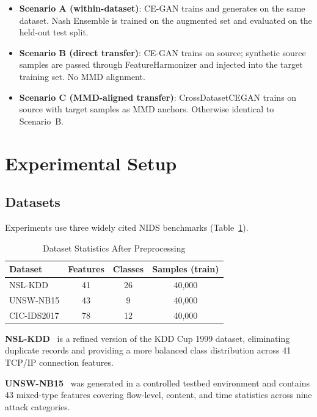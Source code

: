 \documentclass[conference]{IEEEtran}
\begin{document}
\begin{itemize}
  \item \textbf{Scenario A (within-dataset)}: CE-GAN trains and generates
    on the same dataset. Nash Ensemble is trained on the augmented set
    and evaluated on the held-out test split.
  \item \textbf{Scenario B (direct transfer)}: CE-GAN trains on source;
    synthetic source samples are passed through FeatureHarmonizer and
    injected into the target training set. No MMD alignment.
  \item \textbf{Scenario C (MMD-aligned transfer)}: CrossDatasetCEGAN
    trains on source with target samples as MMD anchors. Otherwise
    identical to Scenario~B.
\end{itemize}

\section{Experimental Setup}

\subsection{Datasets}

Experiments use three widely cited NIDS benchmarks (Table~\ref{tab:datasets}).

\begin{table}[htbp]
\caption{Dataset Statistics After Preprocessing}
\label{tab:datasets}
\centering
\begin{tabular}{lccc}
\toprule
Dataset & Features & Classes & Samples (train) \\
\midrule
NSL-KDD       & 41 & 26 & 40,000 \\
UNSW-NB15     & 43 &  9 & 40,000 \\
CIC-IDS2017   & 78 & 12 & 40,000 \\
\bottomrule
\end{tabular}
\end{table}

\textbf{NSL-KDD}~\cite{tavallaee2009detailed} is a refined version of
the KDD Cup 1999 dataset, eliminating duplicate records and providing a
more balanced class distribution across 41 TCP/IP connection features.

\textbf{UNSW-NB15}~\cite{moustafa2015unsw} was generated in a controlled
testbed environment and contains 43 mixed-type features covering flow-level,
content, and time statistics across nine attack categories.
\end{document}
